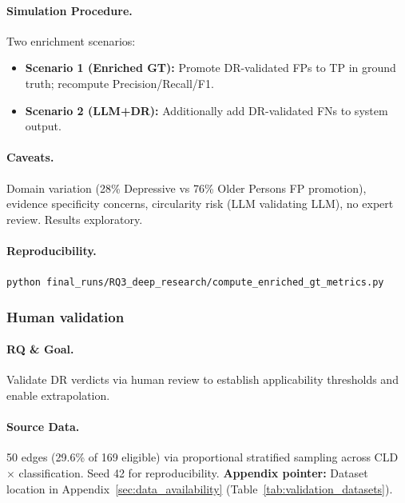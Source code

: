 \paragraph{Simulation Procedure.}
Two enrichment scenarios:
\begin{itemize}[noitemsep]
    \item \textbf{Scenario 1 (Enriched GT):} Promote DR-validated FPs to TP in ground truth; recompute Precision/Recall/F1.
    \item \textbf{Scenario 2 (LLM+DR):} Additionally add DR-validated FNs to system output.
\end{itemize}

\paragraph{Caveats.}
Domain variation (28\% Depressive vs 76\% Older Persons FP promotion), evidence specificity concerns, circularity risk (LLM validating LLM), no expert review. Results exploratory.

\paragraph{Reproducibility.}
\texttt{python final\_runs/RQ3\_deep\_research/compute\_enriched\_gt\_metrics.py}

\subsubsection{Human validation}
\label{sec:rq3_human_validation}

\paragraph{RQ \& Goal.}
Validate DR verdicts via human review to establish applicability thresholds and enable extrapolation.

\paragraph{Source Data.}
50 edges (29.6\% of 169 eligible) via proportional stratified sampling across CLD $\times$ classification. Seed 42 for reproducibility.
\textbf{Appendix pointer:} Dataset location in Appendix~\ref{sec:data_availability} (Table~\ref{tab:validation_datasets}).

